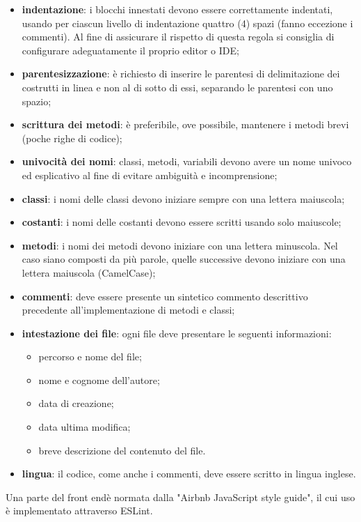 	\begin{itemize}
		\item \textbf{indentazione}: i blocchi innestati devono essere correttamente 
			indentati, usando per ciascun livello di indentazione quattro (4) spazi (fanno 
			eccezione i commenti). Al fine di assicurare il rispetto di questa regola si 
			consiglia di configurare adeguatamente il proprio editor o IDE;
		\item \textbf{parentesizzazione}: è richiesto di inserire le parentesi di delimitazione dei costrutti in linea e non al di sotto di essi, separando le parentesi con uno spazio;
		\item \textbf{scrittura dei metodi}: è preferibile, ove possibile, 
			mantenere i metodi brevi (poche righe di codice);
		\item \textbf{univocità dei nomi}: classi, metodi, variabili devono avere un 
			nome univoco	ed esplicativo al fine di evitare ambiguità e incomprensione;
		\item \textbf{classi}: i nomi delle classi devono iniziare sempre con una 
			lettera maiuscola;		
		\item \textbf{costanti}: i nomi delle costanti devono essere scritti usando 
			solo maiuscole;
		\item \textbf{metodi}: i nomi dei metodi devono iniziare con una lettera 
			minuscola. Nel caso siano composti da più parole, quelle successive devono iniziare con una 
			lettera maiuscola (CamelCase\glo{});
		\item \textbf{commenti}: deve essere presente un sintetico commento descrittivo precedente all'implementazione di metodi e classi;
		\item \textbf{intestazione dei file}: ogni file deve presentare le seguenti informazioni:
			\begin{itemize}
				\item percorso e nome del file;
				\item nome e cognome dell'autore;
				\item data di creazione;
				\item data ultima modifica;
				\item breve descrizione del contenuto del file.
			\end{itemize}
		\item \textbf{lingua}: il codice, come anche i commenti, deve essere scritto 
			in lingua inglese.
	\end{itemize}
Una parte del front end\glosp è normata dalla "Airbnb JavaScript style 
guide", il cui uso è implementato attraverso ESLint\glo. \newline \newline
